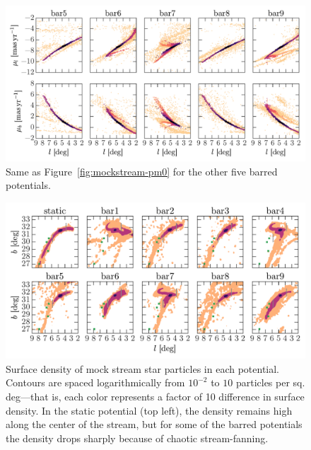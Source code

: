 \documentclass[letterpaper,12pt,preprint]{aastex}
\begin{document}
\begin{landscape}
\begin{figure}[p]
\begin{center}
\includegraphics[width=1.2\textwidth]{figures/mockstream-pm1}
\caption{ Same as Figure~\ref{fig:mockstream-pm0} for the other five barred potentials. }
\label{fig:mockstream-pm1}
\end{center}
\end{figure}
\end{landscape}

\begin{landscape}
\begin{figure}[p]
\begin{center}
\includegraphics[width=1.3\textwidth]{figures/mockstream-density}
\caption{ Surface density of mock stream star particles in each potential. Contours are spaced logarithmically from $10^{-2}$ to $10$ particles per sq. deg---that is, each color represents a factor of 10 difference in surface density. In the static potential (top left), the density remains high along the center of the stream, but for some of the barred potentials the density drops sharply because of chaotic stream-fanning. }
\label{fig:mockstream-density}
\end{center}
\end{figure}
\end{landscape}
\end{document}
